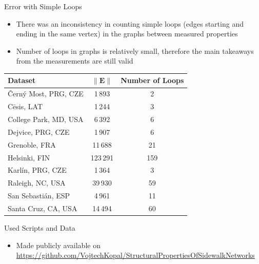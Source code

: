 \documentclass{beamer}
\begin{document}
\begin{frame}{Error with Simple Loops}
    \begin{itemize}
        \item There was an inconsistency in counting simple loops (edges starting and ending in the same vertex) in the graphs between measured properties
        \item Number of loops in graphs is relatively small, therefore the main takeaways from the measurements are still valid
    \end{itemize}
    \begin{table}
    \begin{tabular}{l|c|c}
	\textbf{Dataset} & $\|\mathbf{E}\|$& Number of Loops  \tabularnewline \hline \hline
 	Černý Most, PRG, CZE & 1\,893 & 2 \tabularnewline \hline
 	Cēsis, LAT	& 1\,244	& 3 \tabularnewline \hline
 	College Park, MD, USA & 6\,392 & 6 \tabularnewline \hline
 	Dejvice, PRG, CZE & 1\,907 & 6 \tabularnewline \hline
 	Grenoble, FRA & 11\,688 & 21  \tabularnewline \hline
    Helsinki, FIN & 123\,291 & 159 \tabularnewline \hline
 	Karlín, PRG, CZE & 1\,364 & 3 \tabularnewline \hline
 	Raleigh, NC, USA & 39\,930 & 59 \tabularnewline \hline
 	San Sebastián, ESP & 4\,961 & 11 \tabularnewline \hline
 	Santa Cruz, CA, USA  & 14\,494 &60 \tabularnewline
  \end{tabular}
  \end{table}
\end{frame}

\begin{frame}{Used Scripts and Data}
    \begin{itemize}
        \item Made publicly available on \url{https://github.com/VojtechKopal/StructuralPropertiesOfSidewalkNetworks}
    \end{itemize}
\end{frame}
\end{document}
